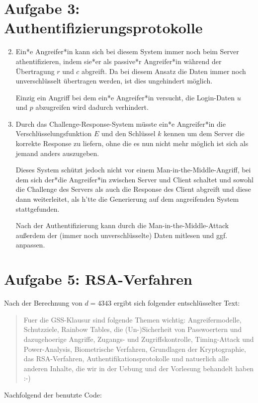 \documentclass[a4paper,11pt,ngerman]{scrartcl}
\begin{document}
\section*{Aufgabe 3: Authentifizierungsprotokolle}
  \begin{enumerate}[\bf 1.]
    \setcounter{enumi}{1}
    \item
      Ein*e Angreifer*in kann sich bei diesem System immer noch beim Server athentifizieren,
      indem sie*er als passive*r Angreifer*in während der Übertragung $r$ und $c$ abgreift.
      Da bei diesem Ansatz die Daten immer noch unverschlüsselt übertragen werden, ist
      dies ungehindert möglich.

      Einzig ein Angriff bei dem ein*e Angreifer*in versucht, die Login-Daten $u$ und $p$
      abzugreifen wird dadurch verhindert.
    \item
      Durch das Challenge-Response-System müsste ein*e Angreifer*in die Verschlüsselungsfunktion
      $E$ und den Schlüssel $k$ kennen um dem Server die korrekte Response zu liefern,
      ohne die es nun nicht mehr möglich ist sich als jemand anders auszugeben.

      Dieses System schützt jedoch nicht vor einem Man-in-the-Middle-Angriff, bei dem
      sich der*die Angreifer*in zwischen Server und Client schaltet und sowohl die
      Challenge des Servers als auch die Response des Client abgreift und diese dann
      weiterleitet, als h'tte die Generierung auf dem angreifenden System stattgefunden.

      Nach der Authentifizierung kann durch die Man-in-the-Middle-Attack außerdem der
      (immer noch unverschlüsselte) Daten mitlesen und ggf. anpassen.
  \end{enumerate}

\section*{Aufgabe 5: RSA-Verfahren}
  Nach der Berechnung von $d=4343$ ergibt sich folgender entschlüsselter Text:
    \begin{quote}
      Fuer die GSS-Klausur sind folgende Themen wichtig: Angreifermodelle, Schutzziele,
      Rainbow Tables, die (Un-)Sicherheit von Passwoertern und dazugehoerige Angriffe,
      Zugangs- und Zugriffskontrolle, Timing-Attack und Power-Analysis, Biometrische Verfahren,
      Grundlagen der Kryptographie, das RSA-Verfahren, Authentifikationsprotokolle und
      natuerlich alle anderen Inhalte, die wir in der Uebung und der Vorlesung behandelt
      haben :-)
    \end{quote}
  Nachfolgend der benutzte Code:
  \inputminted[linenos,numbersep=12pt,autogobble,frame=lines,framesep=2mm]%
          {python3}{rsadecryp.py}
\end{document}
